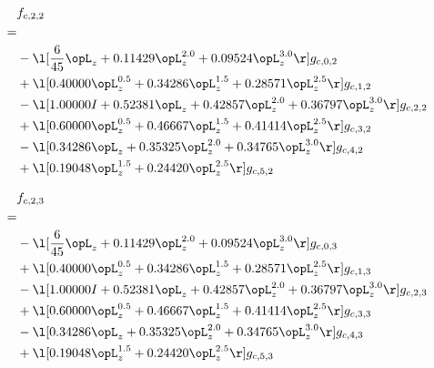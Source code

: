 \begin{alignat}{2} 
\label{eq:f_22_0} 
& f_{c,2,2} \nonumber \\ 
 = \\ 
& - \l[ \frac{6}{45} \opL_z +  0.11429 \opL_z^{2.0} +  0.09524 \opL_z^{3.0}  \r] g_{c,0,2} \nonumber \\ 
& + \l[  0.40000 \opL_z^{0.5} +  0.34286 \opL_z^{1.5} +  0.28571 \opL_z^{2.5}  \r] g_{c,1,2} \nonumber \\ 
& - \l[  1.00000 I +  0.52381 \opL_z +  0.42857 \opL_z^{2.0} +  0.36797 \opL_z^{3.0}  \r] g_{c,2,2} \nonumber \\ 
& + \l[  0.60000 \opL_z^{0.5} +  0.46667 \opL_z^{1.5} +  0.41414 \opL_z^{2.5}  \r] g_{c,3,2} \nonumber \\ 
& - \l[  0.34286 \opL_z +  0.35325 \opL_z^{2.0} +  0.34765 \opL_z^{3.0}  \r] g_{c,4,2} \nonumber \\ 
& + \l[  0.19048 \opL_z^{1.5} +  0.24420 \opL_z^{2.5}  \r] g_{c,5,2} \nonumber \\ 
\end{alignat} 


\begin{alignat}{2} 
\label{eq:f_23_0} 
& f_{c,2,3} \nonumber \\ 
 = \\ 
& - \l[ \frac{6}{45} \opL_z +  0.11429 \opL_z^{2.0} +  0.09524 \opL_z^{3.0}  \r] g_{c,0,3} \nonumber \\ 
& + \l[  0.40000 \opL_z^{0.5} +  0.34286 \opL_z^{1.5} +  0.28571 \opL_z^{2.5}  \r] g_{c,1,3} \nonumber \\ 
& - \l[  1.00000 I +  0.52381 \opL_z +  0.42857 \opL_z^{2.0} +  0.36797 \opL_z^{3.0}  \r] g_{c,2,3} \nonumber \\ 
& + \l[  0.60000 \opL_z^{0.5} +  0.46667 \opL_z^{1.5} +  0.41414 \opL_z^{2.5}  \r] g_{c,3,3} \nonumber \\ 
& - \l[  0.34286 \opL_z +  0.35325 \opL_z^{2.0} +  0.34765 \opL_z^{3.0}  \r] g_{c,4,3} \nonumber \\ 
& + \l[  0.19048 \opL_z^{1.5} +  0.24420 \opL_z^{2.5}  \r] g_{c,5,3} \nonumber \\ 
\end{alignat} 


